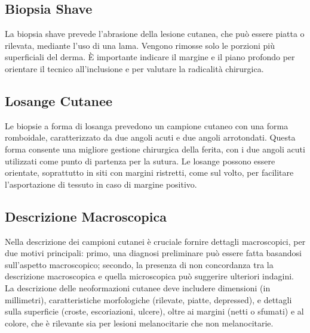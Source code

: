 \subsection{Biopsia Shave}
La biopsia shave prevede l'abrasione della lesione cutanea, che può essere piatta o rilevata, mediante l'uso di una lama. Vengono rimosse solo le porzioni più superficiali del derma. È importante indicare il margine e il piano profondo per orientare il tecnico all'inclusione e per valutare la radicalità chirurgica.

\subsection{Losange Cutanee}
Le biopsie a forma di losanga prevedono un campione cutaneo con una forma romboidale, caratterizzato da due angoli acuti e due angoli arrotondati. Questa forma consente una migliore gestione chirurgica della ferita, con i due angoli acuti utilizzati come punto di partenza per la sutura. Le losange possono essere orientate, soprattutto in siti con margini ristretti, come sul volto, per facilitare l'asportazione di tessuto in caso di margine positivo.

\subsection{Descrizione Macroscopica}
Nella descrizione dei campioni cutanei è cruciale fornire dettagli macroscopici, per due motivi principali: primo, una diagnosi preliminare può essere fatta basandosi sull'aspetto macroscopico; secondo, la presenza di non concordanza tra la descrizione macroscopica e quella microscopica può suggerire ulteriori indagini. La descrizione delle neoformazioni cutanee deve includere dimensioni (in millimetri), caratteristiche morfologiche (rilevate, piatte, depressed), e dettagli sulla superficie (croste, escoriazioni, ulcere), oltre ai margini (netti o sfumati) e al colore, che è rilevante sia per lesioni melanocitarie che non melanocitarie.

